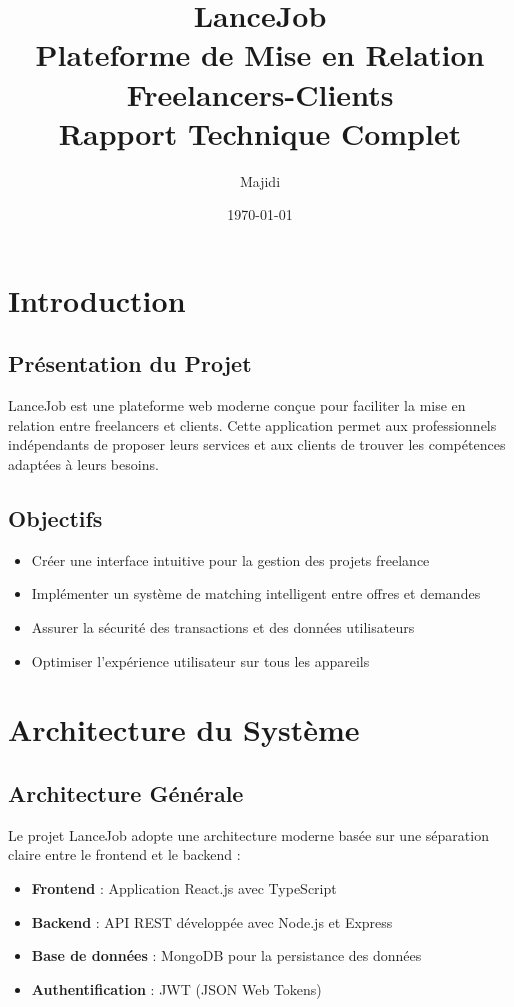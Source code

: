 \documentclass[12pt,a4paper]{article}
\title{\textbf{LanceJob} \\ Plateforme de Mise en Relation Freelancers-Clients \\ \large Rapport Technique Complet}
\author{Majidi}
\date{\today}
\begin{document}
\maketitle
\newpage

\tableofcontents
\newpage

\section{Introduction}

\subsection{Présentation du Projet}
LanceJob est une plateforme web moderne conçue pour faciliter la mise en relation entre freelancers et clients. Cette application permet aux professionnels indépendants de proposer leurs services et aux clients de trouver les compétences adaptées à leurs besoins.

\subsection{Objectifs}
\begin{itemize}
    \item Créer une interface intuitive pour la gestion des projets freelance
    \item Implémenter un système de matching intelligent entre offres et demandes
    \item Assurer la sécurité des transactions et des données utilisateurs
    \item Optimiser l'expérience utilisateur sur tous les appareils
\end{itemize}

\section{Architecture du Système}

\subsection{Architecture Générale}
Le projet LanceJob adopte une architecture moderne basée sur une séparation claire entre le frontend et le backend :

\begin{itemize}
    \item \textbf{Frontend} : Application React.js avec TypeScript
    \item \textbf{Backend} : API REST développée avec Node.js et Express
    \item \textbf{Base de données} : MongoDB pour la persistance des données
    \item \textbf{Authentification} : JWT (JSON Web Tokens)
\end{itemize}
\end{document}

